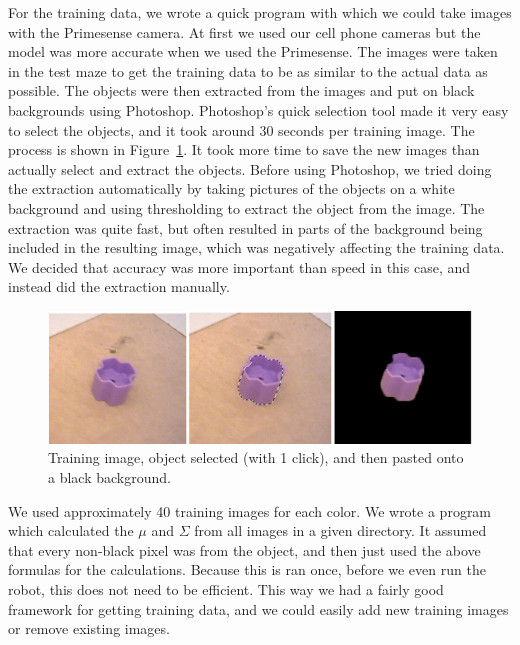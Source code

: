 \documentclass[10pt,a4paper,twocolumn]{article}
\begin{document}
For the training data, we wrote a quick program with which we could take images
with the Primesense camera. At first we used our cell phone cameras but the
model was more accurate when we used the Primesense. The images were taken in
the test maze to get the training data to be as similar to the actual data as
possible. The objects were then extracted from the images and put on black
backgrounds using Photoshop. Photoshop’s quick selection tool made it very easy
to select the objects, and it took around 30 seconds per training image. The
process is shown in Figure~\ref{fig:purpim}. It took more time to save the new
images than actually select and extract the objects. Before using Photoshop, we
tried doing the extraction automatically by taking pictures of the objects on a
white background and using thresholding to extract the object from the image.
The extraction was quite fast, but often resulted in parts of the background
being included in the resulting image, which was negatively affecting the
training data. We decided that accuracy was more important than speed in this
case, and instead did the extraction manually.
\begin{figure}
  \centering
  \includegraphics[width=\linewidth]{images/purpim.png}
  \caption{Training image, object selected (with 1 click), and then pasted onto a black background.}
  \label{fig:purpim}
\end{figure}
We used approximately 40 training images for each color. We wrote a program
which calculated the $\mu$ and $\Sigma$ from all images in a given directory. It
assumed that every non-black pixel was from the object, and then just used the
above formulas for the calculations. Because this is ran once, before we even
run the robot, this does not need to be efficient. This way we had a fairly good
framework for getting training data, and we could easily add new training images
or remove existing images.
\end{document}
